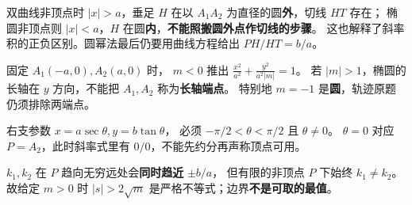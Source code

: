 \begin{trapbox}
\begin{description}[style=nextline,leftmargin=2.8em,itemsep=0.55em]
 \item[\textbf{\textcolor{CTrap}{易错8：圆幂法在椭圆内仍作实切线}}]
 双曲线非顶点时 $|x|>a$，垂足 $H$ 在以 $A_1A_2$ 为直径的圆\textbf{外}，切线 $HT$ 存在；
 椭圆非顶点则 $|x|<a$，$H$ 在圆\textbf{内}，\textbf{不能照搬圆外点作切线的步骤}。
 这也解释了斜率积的正负区别。圆幂法最后仍要用曲线方程给出 $PH/HT=b/a$。

 \item[\textbf{\textcolor{CTrap}{易错9：把统一模型的所有椭圆都看成横长轴}}]
 固定 $A_1(-a,0),A_2(a,0)$ 时，
 $m<0$ 推出 $\frac{x^2}{a^2}+\frac{y^2}{a^2|m|}=1$。
 若 $|m|>1$，椭圆的长轴在 $y$ 方向，不能把 $A_1,A_2$ 称为\textbf{长轴端点}。
 特别地 $m=-1$ 是\textbf{圆}，轨迹原题仍须排除两端点。

 \item[\textbf{\textcolor{CTrap}{易错10：半角参数把顶点误包含进来}}]
 右支参数 $x=a\sec\theta,y=b\tan\theta$，
 必须 $-\pi/2<\theta<\pi/2$ 且 $\theta\ne0$。
 $\theta=0$ 对应 $P=A_2$，此时斜率式里有 $0/0$，不能先约分再声称顶点可用。

 \item[\textbf{\textcolor{CTrap}{易错11：将渐近线的极限当成有限点}}]
 $k_1,k_2$ 在 $P$ 趋向无穷远处会\textbf{同时趋近} $\pm b/a$，
 但有限的非顶点 $P$ 下始终 $k_1\ne k_2$。
 故给定 $m>0$ 时 $|s|>2\sqrt m$ 是严格不等式；边界\textbf{不是可取的最值}。

\end{description}
\end{trapbox}
